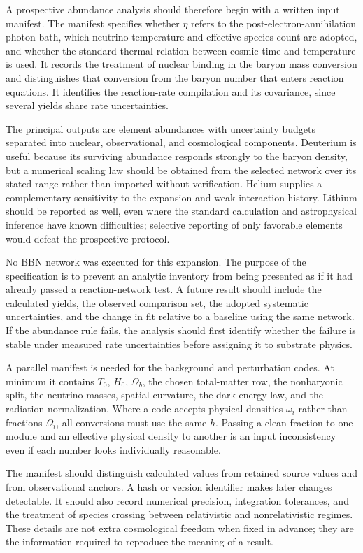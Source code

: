 A prospective abundance analysis should therefore begin with a written input manifest. The manifest specifies whether $\eta$ refers to the post-electron-annihilation photon bath, which neutrino temperature and effective species count are adopted, and whether the standard thermal relation between cosmic time and temperature is used. It records the treatment of nuclear binding in the baryon mass conversion and distinguishes that conversion from the baryon number that enters reaction equations. It identifies the reaction-rate compilation and its covariance, since several yields share rate uncertainties.

The principal outputs are element abundances with uncertainty budgets separated into nuclear, observational, and cosmological components. Deuterium is useful because its surviving abundance responds strongly to the baryon density, but a numerical scaling law should be obtained from the selected network over its stated range rather than imported without verification. Helium supplies a complementary sensitivity to the expansion and weak-interaction history. Lithium should be reported as well, even where the standard calculation and astrophysical inference have known difficulties; selective reporting of only favorable elements would defeat the prospective protocol.

No BBN network was executed for this expansion. The purpose of the specification is to prevent an analytic inventory from being presented as if it had already passed a reaction-network test. A future result should include the calculated yields, the observed comparison set, the adopted systematic uncertainties, and the change in fit relative to a baseline using the same network. If the abundance rule fails, the analysis should first identify whether the failure is stable under measured rate uncertainties before assigning it to substrate physics.

A parallel manifest is needed for the background and perturbation codes. At minimum it contains $T_0$, $H_0$, $\Omega_b$, the chosen total-matter row, the nonbaryonic split, the neutrino masses, spatial curvature, the dark-energy law, and the radiation normalization. Where a code accepts physical densities $\omega_i$ rather than fractions $\Omega_i$, all conversions must use the same $h$. Passing a clean fraction to one module and an effective physical density to another is an input inconsistency even if each number looks individually reasonable.

The manifest should distinguish calculated values from retained source values and from observational anchors. A hash or version identifier makes later changes detectable. It should also record numerical precision, integration tolerances, and the treatment of species crossing between relativistic and nonrelativistic regimes. These details are not extra cosmological freedom when fixed in advance; they are the information required to reproduce the meaning of a result.

